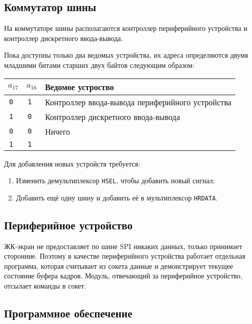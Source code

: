 \documentclass[12pt, a4paper] {ncc}
\begin{document}
\subsection{Коммутатор шины}

На коммутаторе шины располагаются контроллер периферийного устройства и
контроллер дискретного ввода-вывода.

Пока доступны только два ведомых устройства, их адреса определяются двумя
младшими битами старших двух байтов следующим образом:

\begin{tabular}{|c|c|l|}
        \hline
        $a_{17}$ & $a_{16}$ & Ведомое устроство \\
        \hline
        \tt 0 & \tt 1 & Контроллер ввода-вывода периферийного устройства \\
        \hline
        \tt 1 & \tt 0 & Контроллер дискретного ввода-вывода \\
        \hline
        \tt 0 & \tt 0 & Ничего \\
        \cline{1-2}
        \tt 1 & \tt 1 & \\
        \hline
\end{tabular}

Для добавления новых устройств требуется:

\begin{enumerate}
        \item Изменить демультиплексор \texttt{HSEL}, чтобы добавить новый
                сигнал;
        \item Добавить ещё одну шину и добавить её в мультиплексор
                \texttt{HRDATA}.
\end{enumerate}

\subsection{Периферийное устройство}

ЖК-экран не предоставляет по шине SPI никаких данных, только принимает
сторонние. Поэтому в качестве периферийного устройства работает отдельная
программа, которая считывает из сокета данные и демонстрирует текущее состояние
буфера кадров. Модуль, отвечающий за периферийное устройство, отсылает команды
в сокет.

\subsection{Программное обеспечение}
\end{document}
